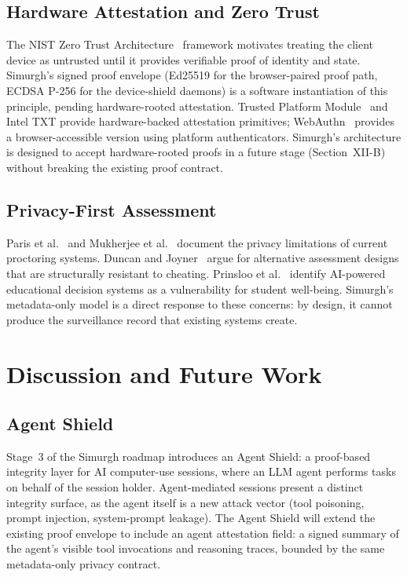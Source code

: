 \documentclass[conference]{IEEEtran}
\begin{document}
\subsection{Hardware Attestation and Zero Trust}

The NIST Zero Trust Architecture~\cite{nist2020zerotrust} framework motivates treating the client device as untrusted until it provides verifiable proof of identity and state. Simurgh's signed proof envelope (Ed25519 for the browser-paired proof path, ECDSA P-256 for the device-shield daemons) is a software instantiation of this principle, pending hardware-rooted attestation. Trusted Platform Module~\cite{tpm2spec} and Intel TXT provide hardware-backed attestation primitives; WebAuthn~\cite{w3c2021webauthn} provides a browser-accessible version using platform authenticators. Simurgh's architecture is designed to accept hardware-rooted proofs in a future stage (Section~XII-B) without breaking the existing proof contract.

\subsection{Privacy-First Assessment}

Paris et al.~\cite{paris2021sins} and Mukherjee et al.~\cite{mukherjee2024balancing} document the privacy limitations of current proctoring systems. Duncan and Joyner~\cite{duncan2022necessity} argue for alternative assessment designs that are structurally resistant to cheating. Prinsloo et al.~\cite{prinsloo2024vulnerable} identify AI-powered educational decision systems as a vulnerability for student well-being. Simurgh's metadata-only model is a direct response to these concerns: by design, it cannot produce the surveillance record that existing systems create.

\section{Discussion and Future Work}

\subsection{Agent Shield}

Stage~3 of the Simurgh roadmap introduces an Agent Shield: a proof-based integrity layer for AI computer-use sessions, where an LLM agent performs tasks on behalf of the session holder. Agent-mediated sessions present a distinct integrity surface, as the agent itself is a new attack vector (tool poisoning, prompt injection, system-prompt leakage). The Agent Shield will extend the existing proof envelope to include an agent attestation field: a signed summary of the agent's visible tool invocations and reasoning traces, bounded by the same metadata-only privacy contract.
\end{document}
